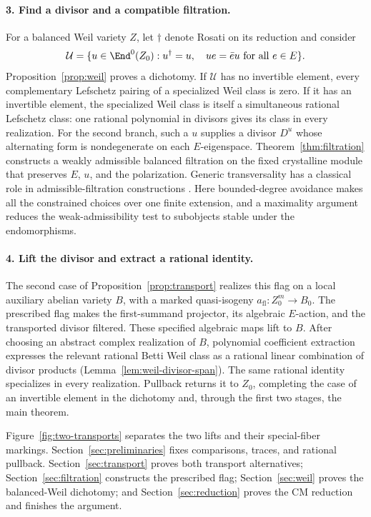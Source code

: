 \paragraph{3. Find a divisor and a compatible filtration.}
For a balanced Weil variety \(Z\), let \(\dagger\) denote Rosati on its
reduction and consider
\[
 \mathcal U=\{u\in\End^0(Z_0):u^\dagger=u,\quad
                         ue=\bar e u\text{ for all }e\in E\}.
\]
Proposition~\ref{prop:weil} proves a dichotomy. If \(\mathcal U\) has no
invertible element, every complementary Lefschetz pairing of a
specialized Weil class is zero. If it has an invertible element, the
specialized Weil class is itself a simultaneous rational Lefschetz
class: one rational polynomial in divisors gives its class in every
realization. For the second branch, such a \(u\) supplies a divisor
\(D^u\) whose alternating form is nondegenerate on each \(E\)-eigenspace.
Theorem~\ref{thm:filtration} constructs a weakly admissible balanced
filtration on the fixed crystalline module that preserves \(E\), \(u\),
and the polarization. Generic transversality has a classical role in
admissible-filtration constructions
\cite[Theorem~1 and Lemmas~1.1--1.2]{FontaineRapoport2005}.
Here bounded-degree avoidance makes all the constrained choices over
one finite extension, and a maximality argument reduces the
weak-admissibility test to subobjects stable under the endomorphisms.

\paragraph{4. Lift the divisor and extract a rational identity.}
The second case of Proposition~\ref{prop:transport} realizes this flag
on a local auxiliary abelian variety \(B\), with a marked quasi-isogeny
\(a_{\mathrm{fl}}:Z_0^m\to B_0\). The prescribed flag makes the
first-summand projector, its algebraic \(E\)-action, and the transported
divisor filtered. These specified algebraic maps lift to \(B\).
After choosing an abstract complex realization of \(B\), polynomial
coefficient extraction expresses the relevant rational Betti Weil class
as a rational linear combination of divisor products
(Lemma~\ref{lem:weil-divisor-span}). The same rational identity specializes
in every realization. Pullback returns it to \(Z_0\), completing the
case of an invertible element in the dichotomy and, through the first two stages, the
main theorem.

Figure~\ref{fig:two-transports} separates the two lifts and their
special-fiber markings. Section~\ref{sec:preliminaries} fixes comparisons,
traces, and rational pullback. Section~\ref{sec:transport} proves both
transport alternatives; Section~\ref{sec:filtration} constructs the
prescribed flag; Section~\ref{sec:weil} proves the balanced-Weil dichotomy;
and Section~\ref{sec:reduction} proves the CM reduction and finishes the
argument.


